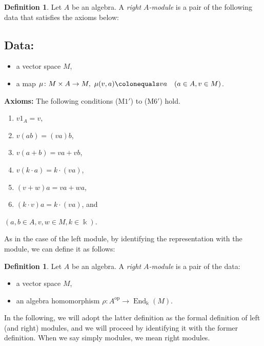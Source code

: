 \documentclass{surv-l}
\numberwithin{equation}{chapter}
\numberwithin{figure}{chapter}
\theoremstyle{plain}
\theoremstyle{definition}
\newtheorem{dfn}[thm]{Definition}
\theoremstyle{remark}
\DeclareMathOperator{\End}{End}
\begin{document}
\begin{dfn}
Let $A$ be an algebra.
A \emph{right $A$-module} is a pair of the following data that satisfies the axioms below:

\subsection*{Data:}
\begin{itemize}
\item
a vector space $M$,
\item
a map $\mu \colon M \times A \to M,\ \mu(v,a)\colonequals  va \quad (a \in A, v \in M)$.
\end{itemize}
{\bf Axioms:}
The following conditions (M$1'$) to (M$6'$) hold.
\begin{enumerate}[label=(M\arabic*$'$)]
\item
$v1_A  = v$,
\item
$v(ab) = (va)b$,
\item
$v(a + b) = va + vb$,
\item
$v(k\cdot a) = k\cdot (va)$,
\item
$(v + w)a = va + wa$,
\item
$(k\cdot v)a = k\cdot (va)$, and
\end{enumerate}
$(a, b \in A, v, w \in M, k \in \Bbbk)$.
\end{dfn}

As in the case of the left module, by identifying the representation
with the module, we can define it as follows:

\begin{dfn}
Let $A$ be an algebra.
A \emph{right $A$-module} is a pair of the data:
\begin{itemize}
\item
a vector space $M$,
\item
an algebra homomorphism
$\rho\colon A^{\mathrm{op}} \to \End_{\Bbbk}(M)$.
\end{itemize}
\end{dfn}

In the following,
we will adopt the latter definition as the formal definition of left (and right) modules,
and we will proceed by identifying it with the former definition.
When we say simply modules, we mean right modules.
\end{document}
